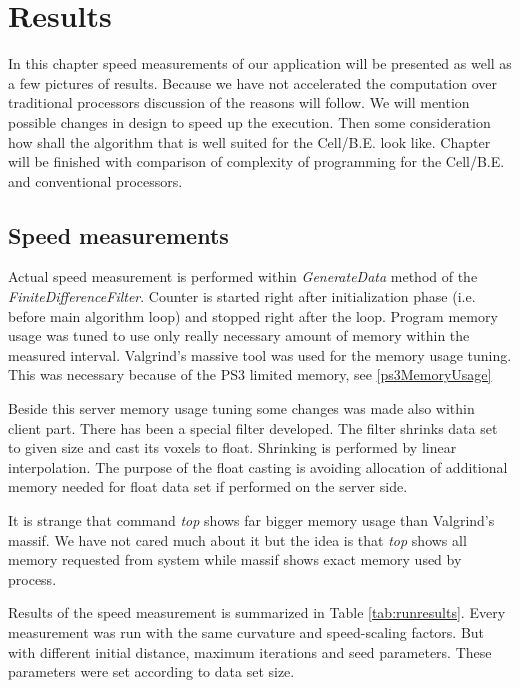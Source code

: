 \chapter{Results}

In this chapter speed measurements of our application will be presented as well as a few pictures of results.
Because we have not accelerated the computation over traditional processors discussion of the reasons will follow.
We will mention possible changes in design to speed up the execution.
Then some consideration how shall the algorithm that is well suited for the \mbox{Cell/B.E.} look like.
Chapter will be finished with comparison of complexity of programming for the \mbox{Cell/B.E.} and conventional processors.

\section{Speed measurements}

\par
Actual speed measurement is performed within \mbox{\emph{GenerateData}} method of the \mbox{\emph{FiniteDifferenceFilter}}.
Counter is started right after initialization phase (i.e. before main algorithm loop) and stopped right after the loop.
Program memory usage was tuned to use only really necessary amount of memory within the measured interval.
Valgrind's massive tool was used for the memory usage tuning.
This was necessary because of the PS3 limited memory, see \ref{ps3MemoryUsage}

\par
Beside this server memory usage tuning some changes was made also within client part.
There has been a special filter developed.
The filter shrinks data set to given size and cast its voxels to float.
Shrinking is performed by linear interpolation.
The purpose of the float casting is avoiding allocation of additional memory needed for float data set if performed on the server side.

\par
It is strange that command \emph{top} shows far bigger memory usage than Valgrind's massif.
We have not cared much about it but the idea is that \emph{top} shows all memory requested from system while massif shows exact memory used by process.

\par
Results of the speed measurement is summarized in Table \ref{tab:runresults}.
Every measurement was run with the same curvature and speed-scaling factors.
But with different initial distance, maximum iterations and seed parameters.
These parameters were set according to data set size.

